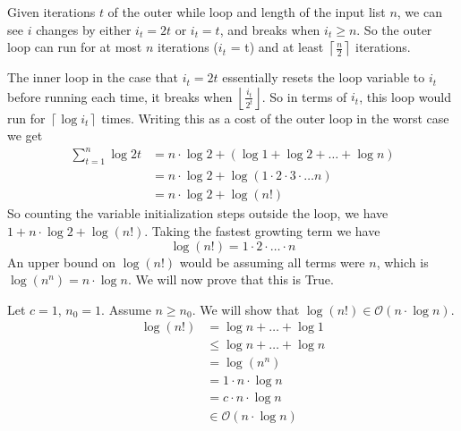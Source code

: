 \documentclass{article}
\begin{document}
\begin{enumerate}
\begin{enumerate}[label=(\alph*)]
                Given iterations $t$ of the outer while loop and 
                length of the input list $n$, we can 
                see $i$ changes by either $i_t = 2t$ or $i_t = t$, and breaks 
                when $i_t \geq n$. So the outer loop can run for at most 
                $n$ iterations ($i_t$ = t) and at least $\left\lceil 
                \frac{n}{2}\right\rceil $ iterations.
                
                
                The inner loop in the case that $i_t = 2t$ essentially
                resets the loop variable to $i_t$ before running 
                each time, it breaks when $\left\lfloor
                \frac{i_t}{2^t} \right\rfloor$. So in terms of $i_t$, 
                this loop would run for $\left\lceil \log i_t \right\rceil$ 
                times. Writing this as a cost of the outer loop in the worst 
                case we get 
                \begin{align*}
                    \sum_{t=1}^{n} \log 2t &= n\cdot \log 2+ 
                    (\log 1 + \log 2 + \ldots + \log n 
                        ) \\
                            &= n \cdot 
                            \log2 + \log (1 \cdot 2 \cdot 3 \cdot \ldots 
                            n ) \tag*{(Since $\log a + 
                        \log b = log (ab)$)} \\
                            &= n \cdot 
                            \log2 + \log (n!)
                \end{align*}
                So counting the variable initialization steps outside the loop, 
                we have $1 + n \cdot \log2 + \log (n!)$. Taking the 
                fastest growting term we have 
                $$\log (n!) = 1 \cdot 2 \cdot \ldots \cdot n$$
                An upper bound on $\log (n!)$ would be assuming all terms 
                were $n$, which is $\log (n^n) = n \cdot \log n$. We will 
                now prove that this is True.

                Let $c = 1$, $n_0 = 1$. Assume $n \geq n_0$. We will show that 
                $\log (n!) \in \mathcal{O} (n \cdot \log n)$.
                \begin{align*}
                    \log (n!) &= \log n + \ldots + \log 1 \\
                              &\leq \log n + \ldots + \log n \\
                              &= \log (n^n) \tag*{(Since $\log a + \log b 
                              = \log (ab)$)}\\
                              &= 1\cdot n \cdot \log n \\
                              &= c \cdot n \cdot \log n \\
                              &\in \mathcal{O} (n \cdot \log n)
                \end{align*}


\end{enumerate}
\end{enumerate}
\end{document}
